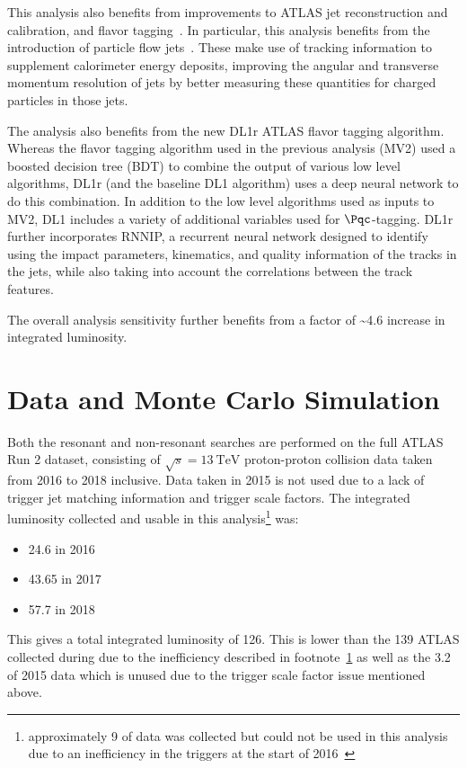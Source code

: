 This analysis also benefits from improvements to ATLAS jet reconstruction and
calibration, and flavor tagging~\cite{FTAG-2018-01}. In particular, this
analysis benefits from the introduction of particle flow
jets~\cite{PERF-2015-09}. These make use of tracking information to supplement
calorimeter energy deposits, improving the angular and transverse momentum
resolution of jets by better measuring these quantities for charged particles in
those jets.

The analysis also benefits from the new DL1r ATLAS flavor tagging algorithm.
Whereas the flavor tagging algorithm used in the previous analysis (MV2) used a
boosted decision tree (BDT) to combine the output of various low level
algorithms, DL1r (and the baseline DL1 algorithm) uses a deep neural network to
do this combination. In addition to the low level algorithms used as inputs to
MV2, DL1 includes a variety of additional variables used for $\Pqc$-tagging. DL1r
further incorporates RNNIP, a recurrent neural network designed
to identify \bjets using the impact parameters, kinematics, and quality
information of the tracks in the jets, while also taking into account the
correlations between the track features.

The overall analysis sensitivity further benefits from a factor of
\textasciitilde 4.6 increase in integrated luminosity.

\section{Data and Monte Carlo Simulation}
Both the resonant and non-resonant searches are performed on the full ATLAS Run 2 dataset, consisting of 
$\sqrt{s} = \SI{13}{\TeV}$ proton-proton collision data taken from 2016 to 2018 inclusive. Data taken in 2015 
is not used due to a lack of trigger jet matching
information and \bjet trigger scale factors. The integrated luminosity collected
and usable in this analysis\footnote{\label{foot:lost-lumi}approximately
  \SI{9}{\ifb} of data was collected but could not be used in this analysis due
  to an inefficiency in the \bjet triggers at the start of 2016~\cite{ATL-COM-DAQ-2019-150}} was:
\begin{itemize}
  \item \SI{24.6}{\ifb} in 2016
  \item \SI{43.65}{\ifb} in 2017
  \item \SI{57.7}{\ifb} in 2018
\end{itemize}

This gives a total integrated luminosity of \SI{126}{\ifb}.
This is lower than the \SI{139}{\ifb} ATLAS collected during \RunTwo
\cite{ATLAS-CONF-2019-021} due to the inefficiency described in
footnote~\ref{foot:lost-lumi} as well as the \SI{3.2}{\ifb} 
of 2015 data which is unused due to the trigger scale factor 
issue mentioned above.

